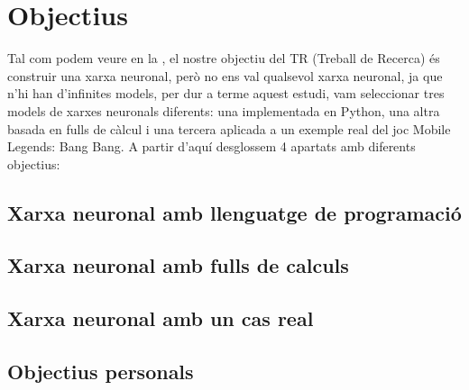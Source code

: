 \chapter{Objectius}
\label{c:objectius}
Tal com podem veure en la , el nostre objectiu del TR (Treball de Recerca) és construir una xarxa neuronal, però no ens val qualsevol xarxa neuronal, ja que n'hi han d'infinites  models, per dur a terme aquest estudi, vam seleccionar tres models de xarxes neuronals diferents: una implementada en Python, una altra basada en fulls de càlcul i una tercera aplicada a un exemple real del joc Mobile Legends: Bang Bang. A partir d'aquí desglossem 4 apartats amb diferents objectius:    


\section{Xarxa neuronal amb llenguatge de programació}\label{sec:Xarxa neuronal amb llenguatge de programació}
\section{Xarxa neuronal amb fulls de calculs}\label{sec:Xarxa neuronal amb fulls de calculs}
\section{Xarxa neuronal amb un cas real}\label{sec:Xarxa neuronal amb un cas real}
\section{Objectius personals}\label{sec:Objectius personals}

